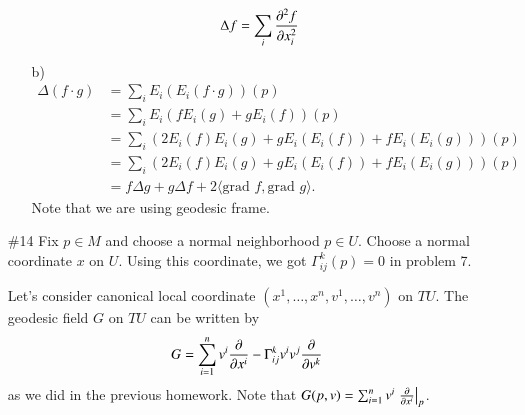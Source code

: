 \documentclass[a4paper, 12pt]{article}
\theoremstyle{Mydefinition}
\theoremstyle{Mytheorem}
\begin{document}
\begin{enumerate}
\begin{enumerate}
\begin{equation}
        \Delta f = \sum_{i}\pdv[2]{f}{x_i}
    \end{equation}
        \item[b)]
        \begin{equation}
            \begin{split}
                \Delta (f\cdot g) &= \sum_{i} E_i(E_i(f\cdot g))(p)\\
                &=\sum_{i} E_i(fE_i(g) + gE_i(f))(p)\\
                &=\sum_{i} \left(2E_i(f)E_i(g)+g E_i(E_i(f))+f E_i(E_i(g))\right)(p)\\
                &=\sum_{i} \left(2E_i(f)E_i(g)+g E_i(E_i(f))+f E_i(E_i(g))\right)(p)\\
                &=f\Delta g + g\Delta f + 2\langle \textrm{grad }f, \textrm{grad }g\rangle.
            \end{split}
        \end{equation}
        Note that we are using geodesic frame.
    \end{enumerate}
    
    \item[\#14] Fix $p\in M$ and choose a normal neighborhood $p\in U$. Choose a normal coordinate $x$ on $U$. Using this coordinate, we got $\Gamma_{ij}^k(p) = 0$ in problem 7.
    
    Let's consider canonical local coordinate $(x^1, \ldots, x^n, v^1, \ldots, v^n)$ on $TU$. The geodesic field $G$ on $TU$ can be written by
    \begin{equation}
        G = \sum_{i=1}^n v^i \pdv{x^i} - \Gamma_{ij}^k v^iv^j \pdv{v^k} 
    \end{equation}
    as we did in the previous homework. Note that $G(p, v) = \sum_{i=1}^n v^i \left.\pdv{x^i}\right|_p$.
    

\end{enumerate}
\end{document}
